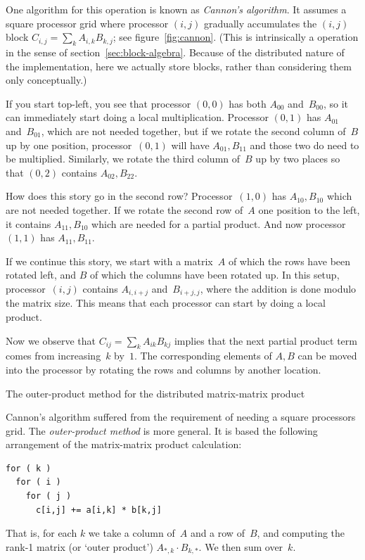 One algorithm for this operation is known as
\emph{Cannon's algorithm}.
It assumes a square processor grid where processor $(i,j)$ gradually
accumulates the $(i,j)$ block $C_{i,j}=\sum_kA_{i,k}B_{k,j}$;
see figure~\ref{fig:cannon}.
(This is intrinsically a  operation
in the sense of section~\ref{sec:block-algebra}.
Because of the distributed nature of the implementation,
here we actually store blocks, rather than considering them only conceptually.)

If you start top-left, you see that processor $(0,0)$ has both
$A_{00}$ and~$B_{00}$, so it can immediately start doing a local multiplication.
Processor $(0,1)$ has $A_{01}$ and~$B_{01}$, which are
not needed together, but if we rotate the second column of~$B$ up
by one position, processor~$(0,1)$ will have $A_{01},B_{11}$ and those
two do need to be multiplied. Similarly, we rotate the third column of~$B$
up by two places so that $(0,2)$ contains $A_{02},B_{22}$.

How does this story go in the second row? Processor~$(1,0)$ has
$A_{10},B_{10}$ which are not needed together. If we rotate
the second row of~$A$ one position to the left, it contains
$A_{11},B_{10}$ which are needed for a partial product.
And now processor~$(1,1)$ has $A_{11},B_{11}$.

If we continue this story, we start with a matrix~$A$ of which the
rows have been rotated left, and $B$ of which the columns have been rotated up.
In this setup, processor~$(i,j)$ contains $A_{i,i+j}$ and~$B_{i+j,j}$,
where the addition is done modulo the matrix size. This means that
each processor can start by doing a local product.

Now we observe that $C_{ij}=\sum_kA_{ik}B_{kj}$ implies that
the next partial product term comes from increasing~$k$ by~$1$.
The corresponding elements of $A,B$ can be moved into the processor
by rotating the rows and columns by another location.

 {The outer-product method for the distributed matrix-matrix
  product}

Cannon's algorithm suffered from the requirement of needing a square
processors grid.
%
The \emph{outer-product method}%
is more general. It is based the following arrangement of the
matrix-matrix product calculation:
\begin{verbatim}
for ( k ) 
  for ( i )
    for ( j )
      c[i,j] += a[i,k] * b[k,j]
\end{verbatim}
That is, for each $k$ we take a column of~$A$ and a row of~$B$, and computing the
rank-1 matrix (or `outer product') $A_{*,k}\cdot B_{k,*}$. We then sum
over~$k$.


